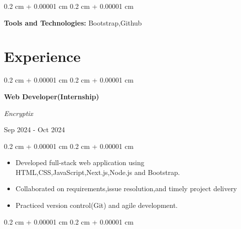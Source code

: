 \documentclass[10pt, letterpaper]{article}
\newenvironment{highlights}{
    \begin{itemize}[
        topsep=0.10 cm,
        parsep=0.10 cm,
        partopsep=0pt,
        itemsep=0pt,
        leftmargin=0.4 cm + 10pt
    ]
}{
    \end{itemize}
} %
\newenvironment{onecolentry}{
    \begin{adjustwidth}{
        0.2 cm + 0.00001 cm
    }{
        0.2 cm + 0.00001 cm
    }
}{
    \end{adjustwidth}
} %
\newenvironment{twocolentry}[2][]{
    \onecolentry
    \def\secondColumn{#2}
    \setcolumnwidth{\fill, 4.5 cm}
    \begin{paracol}{2}
}{
    \switchcolumn \raggedleft \secondColumn
    \end{paracol}
    \endonecolentry
} %
\begin{document}
        \begin{onecolentry}
            \textbf{Tools and Technologies:} Bootstrap,Github
        \end{onecolentry}

    
    \section{Experience}

         
        \begin{samepage}
            \begin{twocolentry}{
               Sep 2024 - Oct 2024
            }
                \textbf{Web Developer(Internship)}

                \textit{Encryptix}

                \vspace{0.10 cm}


            \end{twocolentry}
            \begin{onecolentry}
                \begin{highlights}
                    \item Developed full-stack web application using HTML,CSS,JavaScript,Next.js,Node.js and Bootstrap.
                    \item Collaborated on requirements,issue resolution,and timely project delivery
                    \item Practiced version control(Git) and agile development.
                \end{highlights}
            \end{onecolentry}


            \vspace{0.10 cm}

            \begin{onecolentry}
        
            \end{onecolentry}
        \end{samepage}



      
\end{document}
